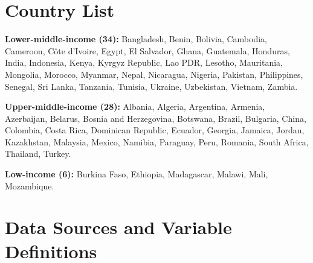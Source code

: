 \documentclass[12pt,a4paper]{article}
\begin{document}
\newpage
\begin{appendices}

\section{Country List}\label{app:countries}

\small
\noindent
\textbf{Lower-middle-income (34):}
Bangladesh, Benin, Bolivia, Cambodia, Cameroon, C\^ote d'Ivoire, Egypt, El Salvador, Ghana, Guatemala, Honduras, India, Indonesia, Kenya, Kyrgyz Republic, Lao PDR, Lesotho, Mauritania, Mongolia, Morocco, Myanmar, Nepal, Nicaragua, Nigeria, Pakistan, Philippines, Senegal, Sri Lanka, Tanzania, Tunisia, Ukraine, Uzbekistan, Vietnam, Zambia.

\medskip\noindent
\textbf{Upper-middle-income (28):}
Albania, Algeria, Argentina, Armenia, Azerbaijan, Belarus, Bosnia and Herzegovina, Botswana, Brazil, Bulgaria, China, Colombia, Costa Rica, Dominican Republic, Ecuador, Georgia, Jamaica, Jordan, Kazakhstan, Malaysia, Mexico, Namibia, Paraguay, Peru, Romania, South Africa, Thailand, Turkey.

\medskip\noindent
\textbf{Low-income (6):}
Burkina Faso, Ethiopia, Madagascar, Malawi, Mali, Mozambique.

\normalsize

\section{Data Sources and Variable Definitions}\label{app:variables}


\end{appendices}
\end{document}
